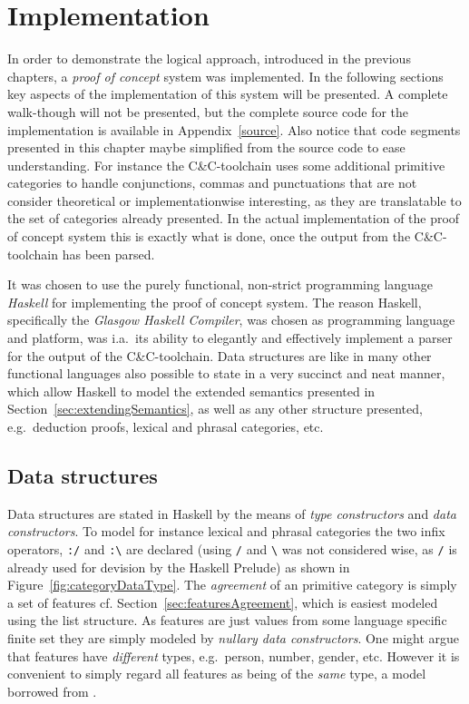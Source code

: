 \chapter{Implementation}
\label{chap:implementation}

In order to demonstrate the logical approach, introduced in the previous chapters, a \emph{proof of concept} system was implemented. In the following sections key aspects of the implementation of this system will be presented. A complete walk-though will not be presented, but the complete source code for the implementation is available in Appendix~\ref{source}. Also notice that code segments presented in this chapter maybe simplified from the source code to ease understanding. For instance the C\&C-toolchain uses some additional primitive categories to handle conjunctions, commas and punctuations that are not consider theoretical or implementationwise interesting, as they are translatable to the set of categories already presented. In the actual implementation of the proof of concept system this is exactly what is done, once the output from the C\&C-toolchain has been parsed.

It was chosen to use the purely functional, non-strict programming language \emph{Haskell} for implementing the proof of concept system. The reason Haskell, specifically the \emph{Glasgow Haskell Compiler}, was chosen as programming language and platform, was i.a.\ its ability to elegantly and effectively implement a parser for the output of the C\&C-toolchain. Data structures are like in many other functional languages also possible to state in a very succinct and neat manner, which allow Haskell to model the extended semantics presented in Section~\ref{sec:extendingSemantics}, as well as any other structure presented, e.g.\ deduction proofs, lexical and phrasal categories, etc.

\section{Data structures}
Data structures are stated in Haskell by the means of \emph{type constructors} and \emph{data constructors}. To model for instance lexical and phrasal categories the two infix operators, \texttt{:/} and \texttt{:\textbackslash} are declared (using \texttt{/} and \texttt{\textbackslash} was not considered wise, as \texttt{/} is already used for devision by the Haskell Prelude) as shown in Figure~\ref{fig:categoryDataType}. The \emph{agreement} of an primitive category is simply a set of features cf. Section~\ref{sec:featuresAgreement}, which is easiest modeled using the list structure. As features are just values from some language specific finite set they are simply modeled by \emph{nullary data constructors}. One might argue that features have \emph{different} types, e.g.\ person, number, gender, etc. However it is convenient to simply regard all features as being of the \emph{same} type, a model borrowed from \citeauthor{cs} . %

